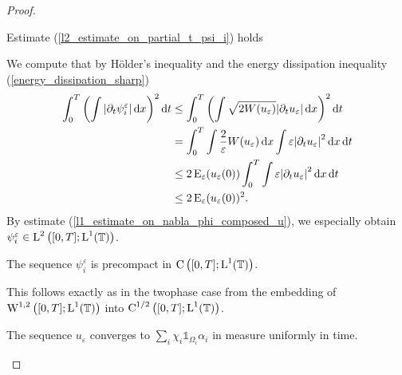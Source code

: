 \begin{proof}
	\begin{description}[wide=0pt]
		\item[Step 1:] Estimate (\ref{l2_estimate_on_partial_t_psi_i}) holds
		
		We compute that by Hölder's inequality and the energy dissipation inequality (\ref{energy_dissipation_sharp})
		\begin{align*}
			\int_{ 0 }^{ T }
				\left(
					\int
						\abs{ \partial_{ t } \psi_{ i }^{ \varepsilon } }
					\dd{ x }
				\right)^{ 2 }
			\dd{ t }
			& \leq
			\int_{ 0 }^{ T }
				\left(
					\int
						\sqrt{ 2 W ( u_{ \varepsilon } ) }
						\abs{ \partial_{ t } u_{ \varepsilon } }
					\dd{ x }
				\right)^{ 2 }
			\dd{ t }
			\\
			& =
			\int_{ 0 }^{ T }
				\int
					\frac{ 2 }{ \varepsilon }
					W ( u_{ \varepsilon } )
				\dd{ x }
				\int
					\varepsilon 
					\abs{ \partial_{ t } u_{ \varepsilon } }^{ 2 }
				\dd{ x }
			\dd{ t }
			\\
			& \leq
			2 \operatorname{E}_{ \varepsilon } ( u_{ \varepsilon } ( 0 ) )
			\int_{ 0 }^{ T }
				\int
					\varepsilon 
					\abs{ \partial_{ t } u_{ \varepsilon } }^{ 2 }
				\dd{ x }
			\dd{ t }
			\\
			& \leq
			2 \operatorname{E}_{ \varepsilon } ( u_{ \varepsilon } ( 0 ) )^{ 2 }.
		\end{align*}
		By estimate (\ref{l1_estimate_on_nabla_phi_composed_u}), we especially obtain $ \psi_{ i }^{ \varepsilon } \in \operatorname{L}^{ 2 } \left( [ 0 , T ] ; \operatorname{L}^{ 1 } ( \operatorname{\mathbb{T}} ) \right) $.
		
		\item[Step 2:] The sequence $ \psi_{ i }^{ \varepsilon } $ is precompact in $ \operatorname{C} \left( [ 0 , T ] ; \operatorname{L}^{ 1 } ( \operatorname{\mathbb{T}} ) \right) $.
		
		This follows exactly as in the twophase case from the embedding of 
		$ \operatorname{W}^{ 1 , 2 } \left( [ 0 , T ] ; \operatorname{L}^{ 1 } ( \operatorname{\mathbb{T}} ) \right) $
		into $ \operatorname{C}^{ 1/2 } \left( [ 0 , T ] ; \operatorname{L}^{ 1 } ( \operatorname{\mathbb{T}} ) \right) $.
		
		\item[Step 3:] The sequence $ u_{ \varepsilon } $ converges to $ \sum_{ i } \chi_{ i } \mathds{ 1 }_{ \Omega_{ i } } \alpha_{ i } $ in measure uniformly in time.
		

\end{description}
\end{proof}
